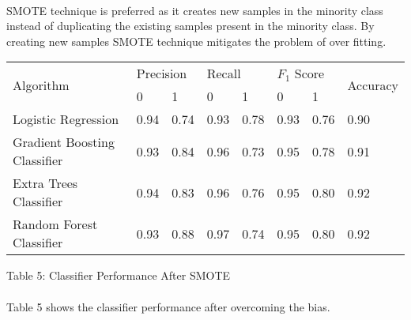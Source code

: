 \documentclass[12pt,letterpaper]{article}
\begin{document}
        \paragraph{}
        
        SMOTE technique is preferred as it creates new samples in the minority class instead of duplicating the existing samples present in the minority class. By creating new samples SMOTE technique mitigates the problem of over fitting.
                
        \begin{table}[H]
            \begin{center}
                \begin{tabular}{|l|l|l|l|l|l|l|l|}
                    \hline
                    \multirow{2}{*}{Algorithm} & \multicolumn{2}{l|}{Precision} & \multicolumn{2}{l|}{Recall} & \multicolumn{2}{l|}{$F_1$ Score} & \multirow{2}{*}{Accuracy} \\ \cline{2-7}
                    & 0              & 1             & 0            & 1            & 0             & 1             &                           \\ \hline
                    Logistic Regression         & 0.94           & 0.74          & 0.93         & 0.78         & 0.93          & 0.76          & 0.90                      \\ \hline
                    Gradient Boosting Classifier & 0.93           & 0.84          & 0.96         & 0.73         & 0.95          & 0.78          & 0.91                      \\ \hline
                    Extra Trees Classifier       & 0.94           & 0.83          & 0.96         & 0.76         & 0.95          & 0.80          & 0.92                      \\ \hline
                    Random Forest Classifier     & 0.93           & 0.88          & 0.97         & 0.74         & 0.95          & 0.80          & 0.92                      \\ \hline
                \end{tabular}
            \end{center}
            \begin{center}
                Table 5: Classifier Performance After SMOTE
            \end{center}
            \paragraph{}
            
                Table 5 shows the classifier performance after overcoming the bias.
        \end{table}
        
\end{document}
